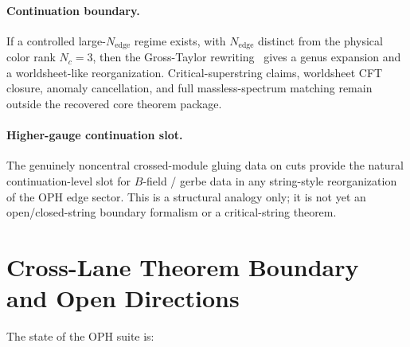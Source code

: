 \paragraph{Continuation boundary.}
If a controlled large-\(N_{\mathrm{edge}}\) regime exists, with \(N_{\mathrm{edge}}\) distinct from
the physical color rank \(N_c=3\), then the Gross-Taylor rewriting~\cite{grossTaylor93} gives a genus expansion and a
worldsheet-like reorganization. Critical-superstring claims, worldsheet CFT closure, anomaly
cancellation, and full massless-spectrum matching remain outside the recovered core theorem package.

\paragraph{Higher-gauge continuation slot.}
The genuinely noncentral crossed-module gluing data on cuts provide the natural continuation-level
slot for \(B\)-field / gerbe data in any string-style reorganization of the OPH edge sector. This
is a structural analogy only; it is not yet an open/closed-string boundary formalism or a
critical-string theorem.

\section{Cross-Lane Theorem Boundary and Open Directions}

The state of the OPH suite is:

